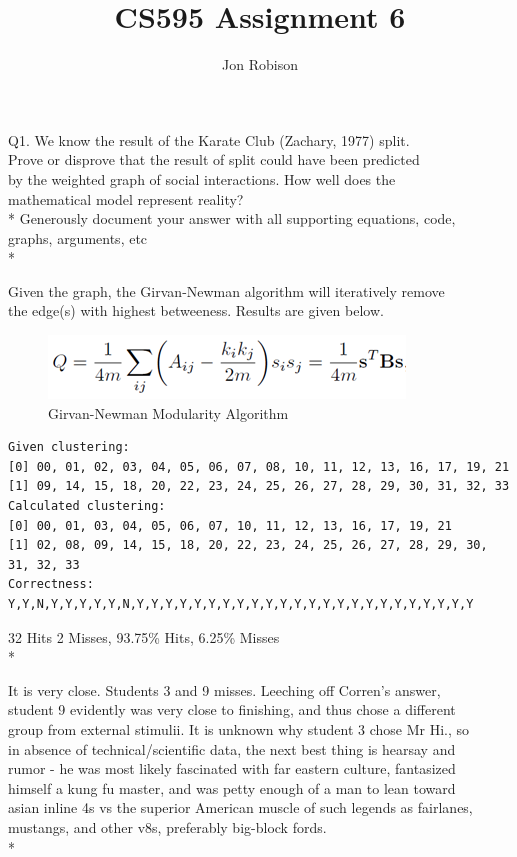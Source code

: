 \documentclass{article}
\begin{document}
\author{Jon Robison}
\title{CS595 Assignment 6}
\maketitle

Q1. We know the result of the Karate Club (Zachary, 1977) split.\\
Prove or disprove that the result of split could have been predicted\\
by the weighted graph of social interactions.  How well does the\\
mathematical model represent reality?\\*
Generously document your answer with all supporting equations, code,\\
graphs, arguments, etc\\*

Given the graph, the Girvan-Newman algorithm will iteratively remove\\
the edge(s) with highest betweeness. Results are given below.\\

\begin{figure}[H]
  \centering
  \caption{Girvan-Newman Modularity Algorithm}
  \includegraphics[scale=.7]{Girvan-Modularity-Equation.png}
\end{figure}
\clearpage

\begin{verbatim}
Given clustering:
[0] 00, 01, 02, 03, 04, 05, 06, 07, 08, 10, 11, 12, 13, 16, 17, 19, 21
[1] 09, 14, 15, 18, 20, 22, 23, 24, 25, 26, 27, 28, 29, 30, 31, 32, 33
Calculated clustering:
[0] 00, 01, 03, 04, 05, 06, 07, 10, 11, 12, 13, 16, 17, 19, 21
[1] 02, 08, 09, 14, 15, 18, 20, 22, 23, 24, 25, 26, 27, 28, 29, 30, 31, 32, 33
Correctness:
Y,Y,N,Y,Y,Y,Y,Y,N,Y,Y,Y,Y,Y,Y,Y,Y,Y,Y,Y,Y,Y,Y,Y,Y,Y,Y,Y,Y,Y,Y,Y,Y
\end{verbatim}
32 Hits 2 Misses, 93.75\% Hits, 6.25\% Misses \\*

It is very close. Students 3 and 9 misses. Leeching off Corren's answer,\\
student 9 evidently was very close to finishing, and thus chose a different\\
group from external stimulii. It is unknown why student 3 chose Mr Hi., so\\
in absence of technical/scientific data, the next best thing is hearsay and\\
rumor - he was most likely fascinated with far eastern culture, fantasized\\
himself a kung fu master, and was petty enough of a man to lean toward\\
asian inline 4s vs the superior American muscle of such legends as fairlanes,\\
mustangs, and other v8s, preferably big-block fords.\\*
\end{document}
